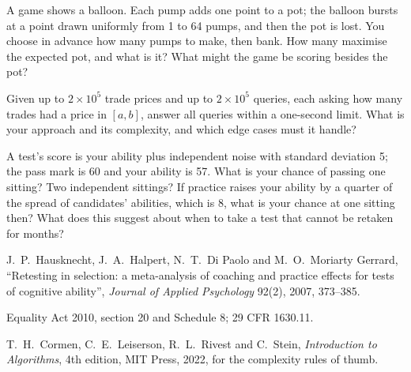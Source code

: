 \begin{interviewq}\label{iq:iv:online-assessments:8}
A game shows a balloon. Each pump adds one point to a pot; the balloon bursts at a point drawn uniformly from 1
to 64 pumps, and then the pot is lost. You choose in advance how many pumps to make, then bank. How many
maximise the expected pot, and what is it? What might the game be scoring besides the pot?
\end{interviewq}

\begin{interviewq}\label{iq:iv:online-assessments:9}
Given up to $2 \times 10^5$ trade prices and up to $2 \times 10^5$ queries, each asking how many trades had a
price in $[a, b]$, answer all queries within a one-second limit. What is your approach and its complexity, and
which edge cases must it handle?
\end{interviewq}

\begin{interviewq}\label{iq:iv:online-assessments:10}
A test's score is your ability plus independent noise with standard deviation 5; the pass mark is 60 and your
ability is 57. What is your chance of passing one sitting? Two independent sittings? If practice raises your
ability by a quarter of the spread of candidates' abilities, which is 8, what is your chance at one sitting
then? What does this suggest about when to take a test that cannot be retaken for months?
\end{interviewq}

\begin{omsources}
\item J.~P.~Hausknecht, J.~A.~Halpert, N.~T.~Di Paolo and M.~O.~Moriarty Gerrard, ``Retesting in selection: a
meta-analysis of coaching and practice effects for tests of cognitive ability'', \emph{Journal of Applied
Psychology} 92(2), 2007, 373--385.
\item Equality Act 2010, section 20 and Schedule 8; 29 CFR 1630.11.
\item T.~H.~Cormen, C.~E.~Leiserson, R.~L.~Rivest and C.~Stein, \emph{Introduction to Algorithms}, 4th
edition, MIT Press, 2022, for the complexity rules of thumb.
\end{omsources}
